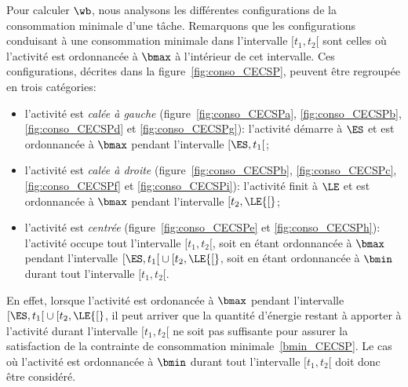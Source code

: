 Pour calculer $\wb$, nous analysons les différentes configurations de
la consommation minimale d'une tâche. Remarquons que les
configurations conduisant à une consommation minimale dans
l'intervalle $[t_1,t_2{[}$ sont celles où l'activité est ordonnancée à
$\bmax$ à l'intérieur de cet intervalle. Ces configurations, décrites
dans la figure~\ref{fig:conso_CECSP}, peuvent être regroupée en trois
catégories:
\begin{itemize}
\item l'activité est {\it calée à
gauche} (figure~\ref{fig:conso_CECSPa}, \ref{fig:conso_CECSPb},
\ref{fig:conso_CECSPd} et \ref{fig:conso_CECSPg}): l'activité démarre
à $\ES$ et est ordonnancée à $\bmax$ pendant l'intervalle
$[\ES,t_1{[}$;
\item l'activité est {\it calée à
droite} (figure~\ref{fig:conso_CECSPb}, \ref{fig:conso_CECSPc},
\ref{fig:conso_CECSPf} et \ref{fig:conso_CECSPi}): l'activité finit à
$\LE$ et est ordonnancée à $\bmax$ pendant l'intervalle $[t_2,\LE{[}$;
\item l'activité est {\it centrée} (figure~\ref{fig:conso_CECSPe} et
\ref{fig:conso_CECSPh}): l'activité occupe tout l'intervalle
$[t_1,t_2[$, soit en étant ordonnancée à $\bmax$ pendant l'intervalle
$[\ES,t_1{[} \cup [t_2,\LE{[}$, soit en étant ordonnancée à $\bmin$
durant tout l'intervalle $[t_1,t_2{[}$.
\end{itemize}
En effet, lorsque l'activité est ordonancée à $\bmax$ pendant
l'intervalle $[\ES,t_1{[} \cup [t_2,\LE{[}$, il peut arriver que la
quantité d'énergie restant à apporter à l'activité durant l'intervalle
$[t_1,t_2[$ ne soit pas suffisante pour assurer la satisfaction de la
contrainte de consommation minimale~\eqref{bmin_CECSP}. Le cas où
l'activité est ordonnancée à $\bmin$ durant tout l'intervalle
$[t_1,t_2{[}$ doit donc être considéré.

